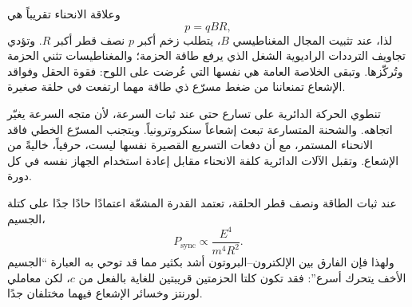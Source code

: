 \begin{classroomqa}\end{classroomqa}

وعلاقة الانحناء تقريباً هي \begin{equation}
p=qBR,
\end{equation} لذا، عند تثبيت المجال المغناطيسي \(B\)، يتطلب زخم أكبر \(p\) نصف قطر أكبر \(R\). وتؤدي تجاويف الترددات الراديوية الشغل الذي يرفع طاقة الحزمة؛ والمغناطيسات تثني الحزمة وتُركّزها. وتبقى الخلاصة العامة هي نفسها التي عُرضت على اللوح: فقوة الحقل وفواقد الإشعاع تمنعاننا من ضغط مسرّع ذي طاقة مهما ارتفعت في حلقة صغيرة.

تنطوي الحركة الدائرية على تسارع حتى عند ثبات السرعة، لأن متجه السرعة يغيّر اتجاهه. والشحنة المتسارعة تبعث إشعاعاً سنكروترونياً. ويتجنب المسرّع الخطي فاقد الانحناء المستمر، مع أن دفعات التسريع القصيرة نفسها ليست، حرفياً، خاليةً من الإشعاع. وتقبل الآلات الدائرية كلفة الانحناء مقابل إعادة استخدام الجهاز نفسه في كل دورة.

\begin{classroomqa}\end{classroomqa}

عند ثبات الطاقة ونصف قطر الحلقة، تعتمد القدرة المشعّة اعتمادًا حادًا جدًا على كتلة الجسيم،
\begin{equation}
P_{\mathrm{sync}}\propto \frac{E^4}{m^4R^2}.
\end{equation}
ولهذا فإن الفارق بين الإلكترون--البروتون أشد بكثير مما قد توحي به العبارة ``الجسيم الأخف يتحرك أسرع'': فقد تكون كلتا الحزمتين قريبتين للغاية بالفعل من \(c\)، لكن معاملي لورنتز وخسائر الإشعاع فيهما مختلفان جدًا.

